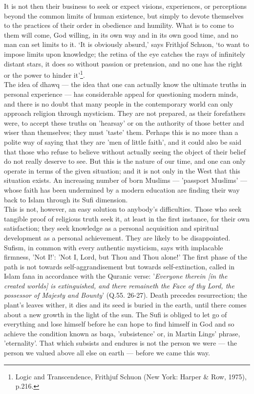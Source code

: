 \documentclass[10pt, twoside]{book}
\begin{document}
It is not then their business to seek or expect visions, experiences, or perceptions beyond the 
common limits of human existence, but simply to devote themselves to the practices of their order in 
obedience and humility. What is to come to them will come, God willing, in its own way and in its own 
good time, and no man can set limits to it. `It is obviously absurd,' says Frithjof Schuon, `to want 
to impose limits upon knowledge; the retina of the eye catches the rays of infinitely distant stars, 
it does so without passion or pretension, and no one has the right or the power to hinder it'\footnote{Logic and Transcendence, Frithjuf Schuon (New York: Harper \& Row, 1975), p.216.}. \\

The idea of dhawq --- the idea that one can actually know the ultimate truths in personal experience --- 
has considerable appeal for questioning modern minds, and there is no doubt that many people in the 
contemporary world can only approach religion through mysticism. They are not prepared, as their 
forefathers were, to accept these truths on 'hearsay' or on the authority of those better and wiser 
than themselves; they must 'taste' them. Perhaps this is no more than a polite way of saying that 
they are 'men of little faith', and it could also be said that those who refuse to believe without 
actually seeing the object of their belief do not really deserve to see. But this is the nature of 
our time, and one can only operate in terms of the given situation; and it is not only in the West 
that this situation exists. An increasing number of born Muslims --- 'passport Muslims' --- whose faith 
has been undermined by a modern education are finding their way back to Islam through its Sufi 
dimension. \\

This is not, however, an easy solution to anybody's difficulties. Those who seek tangible proof of 
religious truth seek it, at least in the first instance, for their own satisfaction; they seek 
knowledge as a personal acquisition and spiritual development as a personal achievement. They are 
likely to be disappointed. Sufism, in common with every authentic mysticism, says with implacable 
firmness, 'Not I!': 'Not I, Lord, but Thou and Thou alone!' The first phase of the path is not 
towards self\hyp{}aggrandisement but towards self\hyp{}extinction, called in Islam fana in accordance with the 
Quranic verse: '\emph{Everyone therein [in the created worlds] is extinguished, and there remaineth the 
Face of thy Lord, the possessor of Majesty and Bounty}' (Q.55. 26-27). Death precedes resurrection; the 
plant's leaves wither, it dies and its seed is buried in the earth, until there comes about a new 
growth in the light of the sun. The Sufi is obliged to let go of everything and lose himself before 
he can hope to find himself in God and so achieve the condition known as baqa, 'subsistence' or, in 
Martin Lings' phrase, 'eternality'. That which subsists and endures is not the person we were --- the 
person we valued above all else on earth --- before we came this way. \\
\end{document}

